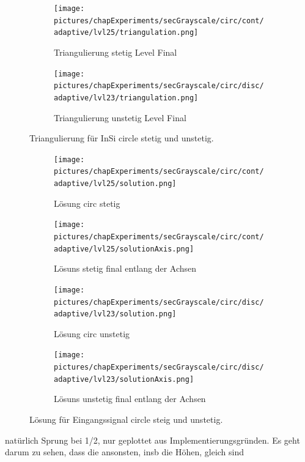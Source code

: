 \begin{figure}[p]
  \begin{subfigure}[b]{.48\linewidth}
    \centering
    \caption{Triangulierung stetig Level Final}
    \texttt{[image: pictures/chapExperiments/secGrayscale/circ/cont/adaptive/lvl25/triangulation.png]}
    \label{fig:circContFinalTriang}
  \end{subfigure}
  \quad
  \begin{subfigure}[b]{.48\linewidth}
    \centering
    \caption{Triangulierung unstetig Level Final}
    \texttt{[image: pictures/chapExperiments/secGrayscale/circ/disc/adaptive/lvl23/triangulation.png]}
    \label{fig:circDiscFinalTriang}
  \end{subfigure}
  \caption{Triangulierung für InSi circle stetig und unstetig.}
  \label{fig:circleTriang}
\end{figure}

\begin{figure}[p]
  \centering
  \begin{subfigure}[b]{.48\linewidth}
    \centering
    \caption{Lösung circ stetig}
    \texttt{[image: pictures/chapExperiments/secGrayscale/circ/cont/adaptive/lvl25/solution.png]}
    \label{fig:circContSol}
  \end{subfigure}
  \quad
  \begin{subfigure}[b]{.48\linewidth}
    \centering
    \caption{Lösuns stetig final entlang der Achsen}
    \texttt{[image: pictures/chapExperiments/secGrayscale/circ/cont/adaptive/lvl25/solutionAxis.png]}
    \label{fig:circContSolAxis}
  \end{subfigure}

  \begin{subfigure}[b]{.48\linewidth}
    \centering
    \caption{Lösung circ unstetig}
    \texttt{[image: pictures/chapExperiments/secGrayscale/circ/disc/adaptive/lvl23/solution.png]}
    \label{fig:circDiscSol}
  \end{subfigure}
  \quad
  \begin{subfigure}[b]{.48\linewidth}
    \centering
    \caption{Lösuns unstetig final entlang der Achsen}
    \texttt{[image: pictures/chapExperiments/secGrayscale/circ/disc/adaptive/lvl23/solutionAxis.png]}
    \label{fig:circDiscSolAxis}
  \end{subfigure}
  \caption{Lösung für Eingangssignal circle steig und unstetig.}
  \label{fig:circleSol}
\end{figure}

 natürlich Sprung bei 1/2, nur geplottet aus
Implementierungsgründen. Es geht darum zu sehen, dass die ansonsten, insb
die Höhen, gleich sind

